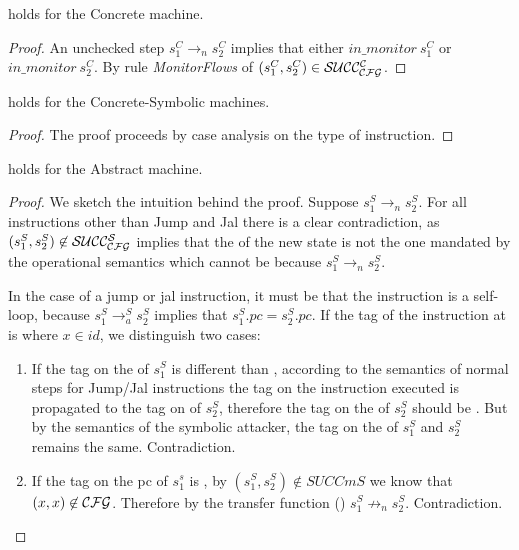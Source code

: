 \begin{lemma}
  \label{cfg_nocheck_CS}
   holds for the Concrete machine.
\end{lemma}
\begin{proof}
  An unchecked step $s^C_1 \to_n s^C_2$ implies
  that either $in\_monitor~s^C_1$ or $in\_monitor~s^C_2$.
  By rule \emph{MonitorFlows} of 
  $(s^C_1,s^C_2) \in \mathcal{SUCC_\mathcal{CFG}^{C}}$.
\end{proof}

\begin{lemma}
  \label{cfg_equiv_CS}
   holds for the Concrete-Symbolic machines.
\end{lemma}
\begin{proof}
  The proof proceeds by case analysis on the type
  of instruction. 
\end{proof}

\begin{lemma}
  \label{av_no_attacker_S}
   holds for the Abstract machine.
\end{lemma}
\begin{proof}

  We sketch the intuition behind the proof.  Suppose $s^S_1 \to_n
  s^S_2$.  For all instructions other than Jump and Jal there is a
  clear contradiction, as $(s^S_1,s^S_2) \not \in \mathcal{SUCC_\mathcal{CFG}^{S}}$ implies
  that the \pc of the new state is not the one mandated by the
  operational semantics which cannot be because $s^S_1 \to_n
  s^S_2$. 

  In the case of a jump or jal instruction, it must be that the
  instruction is a self-loop, because $s^S_1 \to^{S}_a s^S_2$
  implies that $s^S_1.pc = s^S_2.pc$.
  If the tag of the instruction at \pc is  where
  $x \in id$, we distinguish two cases:

  \begin{enumerate}
    \item If the tag on the \pc of $s^S_1$ is different than
      , according to the semantics of normal steps
      for Jump/Jal instructions the tag on the instruction executed
      is propagated to the tag on \pc of $s^S_2$, therefore the tag on
      the \pc of $s^S_2$ should be . But by
      the semantics of the symbolic attacker, the tag on the \pc
      of $s^S_1$ and $s^S_2$ remains the same. Contradiction.
    \item If the tag on the pc of $s^s_1$ is ,
      by $(s^S_1,s^S_2) \not \in SUCCm{S}$ we know that
      $(x,x) \not \in \mathcal{CFG}$. Therefore by the transfer
      function () $s^S_1 \not \to_n s^S_2$.
      Contradiction.
    \end{enumerate}
\end{proof}

